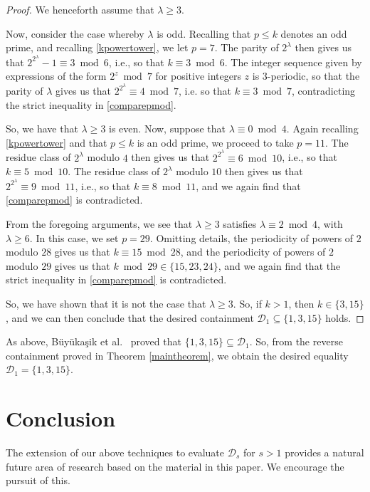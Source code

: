 \documentclass[12pt]{article}
\begin{document}
\begin{proof}
 We henceforth assume that $\lambda \geq 3$. 

 Now, consider the case whereby $\lambda$ is odd. Recalling that $p \leq k$ denotes an odd prime, and recalling \eqref{kpowertower}, 
 we let $p = 7$. The parity of $2^{\lambda}$ then gives us that $2^{2^{\lambda}} - 1 \equiv 3 \bmod 6$, i.e., so that $k \equiv 3 \bmod 
 6$. The integer sequence given by expressions of the form $2^z \bmod 7$ for positive integers $z$ is $3$-periodic, so that the parity of 
 $\lambda$ gives us that  $2^{2^{\lambda}} \equiv 4 \bmod 7$,  i.e. so that $k \equiv 3 \bmod 7$,   contradicting the strict 
 inequality in \eqref{comparepmod}. 

 So, we have that $\lambda \geq 3$ is even. Now, suppose that $\lambda \equiv 0 \bmod 4$. Again recalling \eqref{kpowertower} and 
 that $p \leq k$ is an odd prime, we proceed to take $p = 11$. The residue class of $2^{\lambda}$ modulo $4$ then gives us that 
 $2^{2^{\lambda}} \equiv 6 \bmod 10$, i.e., so that $k \equiv 5 \bmod 10$. The residue class of $2^{\lambda}$ modulo $10$ then gives 
 us that $2^{2^{\lambda}} \equiv 9 \bmod 11$, i.e., so that $k \equiv 8 \bmod 11$, and we again find that \eqref{comparepmod} 
 is contradicted. 

 From the foregoing arguments, we see that $\lambda \geq 3$ satisfies $\lambda \equiv 2 \bmod 4$, with $\lambda \geq 6$. In this case, 
 we set $p = 29$. Omitting details, the periodicity of powers of $2$ modulo 
 $28$ gives us that $k \equiv 15 \bmod 28$, 
 and the periodicity of powers of $2$ modulo $29$ gives us that 
 $k \bmod 29 \in \{ 15, 23, 24 \}$, 
 and we again find that the strict inequality in \eqref{comparepmod} is contradicted. 

 So, we have shown that it is not the case that $\lambda \geq 3$. So, if $k > 1$, then $k \in \{ 3, 15 \}$, and we can then conclude that 
 the desired containment $\mathcal{D}_{1} \subseteq \{ 1, 3, 15 \}$ holds. 
\end{proof}

 As above, B\"{u}y\"{u}ka\c{s}ik et al.\ \cite[Theorem 2(2)]{BuyukasikGoralSertbas2024} proved that $ \{ 1, 3, 15 \} \subseteq 
 \mathcal{D}_{1}$. So, from the reverse containment proved in Theorem 
 \ref{maintheorem}, we obtain the desired equality 
$ \mathcal{D}_{1} = \{ 1, 3, 15 \}$. 

\section{Conclusion}
 The extension of our above techniques to evaluate $\mathcal{D}_{s}$ for $s > 1$ provides a natural future area of research based 
 on the material in this paper. We encourage the pursuit of this. 
\end{document}
